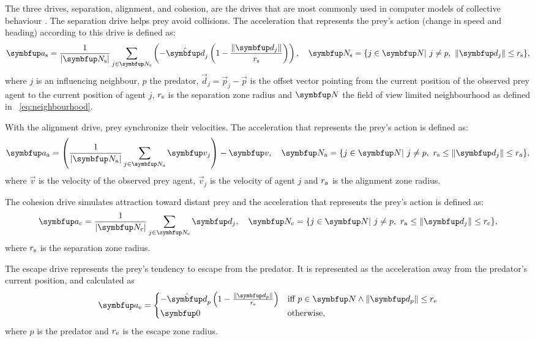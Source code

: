 The three drives, separation, alignment, and cohesion, are the drives that are most commonly used in computer models of collective behaviour \cite{reynolds1987flocks}. The separation drive helps prey avoid collisions. The acceleration that represents the prey's action (change in speed and heading) according to this drive is defined as:
%
\begin{equation}
  \vec{a}_\textnormal{s}=\frac{1}{|\set{N}_\textnormal{s}|} \sum_{j \in \set{N}_\textnormal{s}}\left(-\uvec{d}_j\left(1-\frac{\|\vec{d}_j\|}{r_\textnormal{s}}\right)\right),\quad
  \set{N}_\textnormal{s} = \{j \in \set{N}|\ j \neq p,\ \|\vec{d}_j\| \leq r_\textnormal{s} \},
\end{equation}
%
where $j$ is an influencing neighbour, $p$ the predator, $\vec{d}_j=\vec{p}_j-\vec{p}$ is the offset vector pointing from the current position of the observed prey agent to the current position of agent $j$, $r_\textnormal{s}$ is the separation zone radius and $\set{N}$ the field of view limited neighbourhood as defined in \eq~\eqref{eq:neighbourhood}.

With the alignment drive, prey synchronize their velocities. The acceleration that represents the prey's action is defined as:
%
\begin{equation}
  \vec{a}_\textnormal{a}=\left(\frac{1}{|\set{N}_\textnormal{a}|} \sum_{j \in \set{N}_\textnormal{a}} \vec{v}_j\right)-\vec{v},\quad
  \set{N}_\textnormal{a}=\{j \in \set{N}|\ j \neq p,\ r_\textnormal{s} \leq \|\vec{d}_j\| \leq r_\textnormal{a} \},
\end{equation}
%
where $\vec{v}$ is the velocity of the observed prey agent, $\vec{v}_j$ is the velocity of agent $j$ and $r_\textnormal{a}$ is the alignment zone radius.

The cohesion drive simulates attraction toward distant prey and the acceleration that represents the prey's action is defined as:
%
\begin{equation}
  \vec{a}_\textnormal{c}=\frac{1}{|\set{N}_\textnormal{c}|} \sum_{j \in \set{N}_\textnormal{c}} \vec{d}_j,\quad \set{N}_\textnormal{c}=\{j \in \set{N}|\ j \neq p,\ r_\textnormal{a} \leq \|\vec{d}_j\| \leq r_\textnormal{c} \},
\end{equation}
%
where $r_\textnormal{s}$ is the separation zone radius.

The escape drive represents the prey's tendency to escape from the predator. It is represented as the acceleration away from the predator's current position, and calculated as
%
\begin{equation}
  \vec{a}_\textnormal{e} = \begin{cases}
    -\uvec{d}_p\left(1-\frac{\|\vec{d}_p\|}{r_\textnormal{e}}\right) & \textnormal{iff}\ p \in \set{N} \wedge \|\vec{d}_p\| \leq r_\textnormal{e}\\
    \vec{0} & \textnormal{otherwise,}
  \end{cases}
\end{equation}
%
where $p$ is the predator and $r_\textnormal{e}$ is the escape zone radius.

